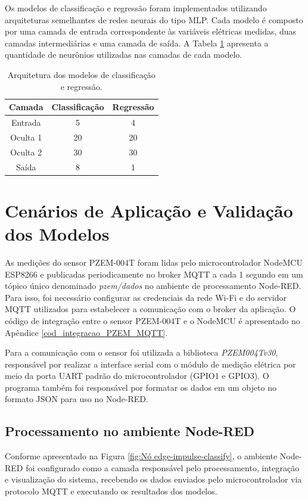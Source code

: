 Os modelos de classificação e regressão foram implementados utilizando arquiteturas semelhantes de redes neurais do tipo MLP. Cada modelo é composto por uma camada de entrada correspondente às variáveis elétricas medidas, duas camadas intermediárias e uma camada de saída. A Tabela \ref{tab:arquitetura_modelos} apresenta a quantidade de neurônios utilizadas nas camadas de cada modelo.

\begin{table}[!htbp]
    \centering
    \caption{Arquitetura dos modelos de classificação e regressão.}
    \label{tab:arquitetura_modelos}
    \begin{tabular}{|c|c|c|}
    \hline
    \textbf{Camada} & \textbf{Classificação} & \textbf{Regressão} \\
    \hline
    Entrada & 5 & 4 \\
    \hline
    Oculta 1 & 20 & 20 \\
    \hline
    Oculta 2 & 30 & 30 \\
    \hline
    Saída & 8 & 1 \\
    \hline
    \end{tabular}
\end{table}

\section{Cenários de Aplicação e Validação dos Modelos}

As medições do sensor PZEM-004T foram lidas pelo microcontrolador NodeMCU ESP8266 e publicadas periodicamente no broker MQTT a cada 1 segundo em um tópico único denominado \textit{pzem/dados} no ambiente de processamento Node-RED. Para isso, foi necessário configurar as credenciais da rede Wi-Fi e do servidor MQTT utilizados para estabelecer a comunicação com o broker da aplicação. O código de integração entre o sensor PZEM-004T e o NodeMCU é apresentado no Apêndice \ref{cod_integracao_PZEM_MQTT}. 

Para a comunicação com o sensor foi utilizada a biblioteca \textit{PZEM004Tv30}, responsável por realizar a interface serial com o módulo de medição elétrica por meio da porta UART padrão do microcontrolador (GPIO1 e GPIO3). O programa também foi responsável por formatar os dados em um objeto no formato JSON para uso no Node-RED.

\subsection{Processamento no ambiente Node-RED}
Conforme apresentado na Figura \ref{fig:Nó edge-impulse-classify}, o ambiente Node-RED foi configurado como a camada responsável pelo processamento, integração e visualização do sistema, recebendo os dados enviados pelo microcontrolador via protocolo MQTT e executando os resultados dos modelos.

